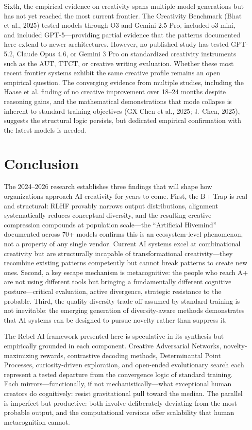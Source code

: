 \documentclass[12pt,a4paper]{article}
\begin{document}
Sixth, the empirical evidence on creativity spans multiple model generations but has not yet reached the most current frontier. The Creativity Benchmark (Bhat et al., 2025) tested models through O3 and Gemini 2.5 Pro, \citet{haase2025} included o3-mini, and \citet{wright2025} included GPT-5---providing partial evidence that the patterns documented here extend to newer architectures. However, no published study has tested GPT-5.2, Claude Opus 4.6, or Gemini 3 Pro on standardized creativity instruments such as the AUT, TTCT, or creative writing evaluation. Whether these most recent frontier systems exhibit the same creative profile remains an open empirical question. The converging evidence from multiple studies, including the Haase et al. finding of no creative improvement over 18--24 months despite reasoning gains, and the mathematical demonstrations that mode collapse is inherent to standard training objectives (GX-Chen et al., 2025; J. Chen, 2025), suggests the structural logic persists, but dedicated empirical confirmation with the latest models is needed.

\section{Conclusion}
The 2024--2026 research establishes three findings that will shape how organizations approach AI creativity for years to come. First, the B+ Trap is real and structural: RLHF provably narrows output distributions, alignment systematically reduces conceptual diversity, and the resulting creative compression compounds at population scale---the ``Artificial Hivemind'' documented across 70+ models confirms this is an ecosystem-level phenomenon, not a property of any single vendor. Current AI systems excel at combinational creativity but are structurally incapable of transformational creativity---they recombine existing patterns competently but cannot break patterns to create new ones. Second, a key escape mechanism is metacognitive: the people who reach A+ are not using different tools but bringing a fundamentally different cognitive posture---critical evaluation, active divergence, strategic resistance to the probable. Third, the quality-diversity trade-off assumed by standard training is not inevitable: the emerging generation of diversity-aware methods demonstrates that AI systems can be designed to pursue novelty rather than suppress it.

The Rebel AI framework presented here is speculative in its synthesis but empirically grounded in each component. Creative Adversarial Networks, novelty-maximizing rewards, contrastive decoding methods, Determinantal Point Processes, curiosity-driven exploration, and open-ended evolutionary search each represent a tested departure from the convergence logic of standard training. Each mirrors---functionally, if not mechanistically---what exceptional human creators do cognitively: resist gravitational pull toward the median. The parallel is imperfect but productive: both involve deliberately deviating from the most probable output, and the computational versions offer scalability that human metacognition cannot.
\end{document}

